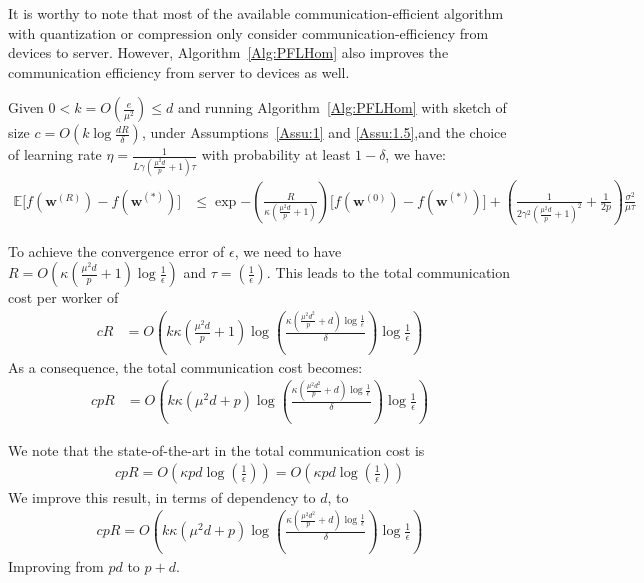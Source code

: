 \begin{remark}
It is worthy to note that most of the available communication-efficient algorithm with quantization or compression only consider communication-efficiency from devices to server. However, Algorithm~\ref{Alg:PFLHom} also improves the communication efficiency from server to devices as well. 
\end{remark}
\begin{theorem}
Given $0<k=O\left(\frac{e}{\mu^2}\right)\leq d$
and running Algorithm~\ref{Alg:PFLHom} with sketch of size $c=O\left(k\log \frac{d R}{\delta}\right)$,  under Assumptions~\ref{Assu:1} and \ref{Assu:1.5},and the choice of learning rate $\eta=\frac{1}{L\gamma (\frac{\mu^2d}{p}+1) \tau}$ with probability at least $1-\delta$, we have:
\begin{align}
                \mathbb{E}\Big[f({\boldsymbol{w}}^{(R)})-f({\boldsymbol{w}}^{(*)})\Big]&\leq \exp{-\left(\frac{ R}{\kappa (\frac{\mu^2d}{p}+1)}\right)}\Big[f({\boldsymbol{w}}^{(0)})-f({\boldsymbol{w}}^{(*)})\Big]+\left(\frac{1}{2\gamma^2 {(\frac{\mu^2d}{p}+1)}^2 }+\frac{1}{2p}\right)\frac{\sigma^2}{\mu\tau}
\end{align}
\end{theorem}

\begin{remark}
To achieve the convergence error of $\epsilon$, we need to have $R=O\left(\kappa(\frac{\mu^2d}{p}+1)\log\frac{1}{\epsilon}\right)$ and $\tau=\left(\frac{1}{\epsilon}\right)$. This leads to the total communication cost per worker of 
\begin{align}
cR&=O\left(k\kappa(\frac{\mu^2d}{p}+1)\log\left(\frac{\kappa(\frac{\mu^2d^2}{p}+d)\log\frac{1}{\epsilon}}{\delta}\right)\log\frac{1}{\epsilon} \right)
\end{align}
As a consequence, the total communication cost becomes:
\begin{align}
cpR&=O\left(k\kappa(\mu^2d+p)\log\left(\frac{\kappa(\frac{\mu^2d^2}{p}+d)\log\frac{1}{\epsilon}}{\delta}\right)\log\frac{1}{\epsilon} \right)
\end{align}
\end{remark}

\begin{remark}
We note that the state-of-the-art in \cite{karimireddy2019scaffold} the total communication cost is 
\begin{align}
    cpR=O\left(\kappa pd\log\left(\frac{1}{\epsilon}\right) \right)=O\left(\kappa pd\log\left(\frac{1}{\epsilon}\right)\right) 
\end{align}
We improve this result, in terms of dependency to $d$, to 
\begin{align}
    cpR=O\left(k\kappa(\mu^2d+p)\log\left(\frac{\kappa(\frac{\mu^2d^2}{p}+d)\log\frac{1}{\epsilon}}{\delta}\right)\log\frac{1}{\epsilon} \right)
\end{align}
Improving from $pd$ to $p+d$.
\end{remark}

